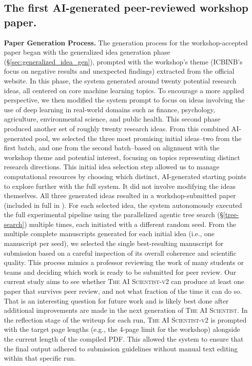 \documentclass[11pt, a4paper]{include/gdm_format}
\newcommand{\ouralgo}{\textsc{The AI Scientist-v2}\xspace}
\begin{document}
\subsection{The first AI-generated peer-reviewed workshop paper.}
\label{sec:first_workshop_paper}
\textbf{Paper Generation Process.}
The generation process for the workshop-accepted paper began with the generalized idea generation phase (\S\ref{sec:generalized_idea_gen}), prompted with the workshop's theme (ICBINB's focus on negative results and unexpected findings) extracted from the official website.
In this phase, the system generated around twenty potential research ideas, all centered on core machine learning topics.
To encourage a more applied perspective, we then modified the system prompt to focus on ideas involving the use of deep learning in real-world domains such as finance, psychology, agriculture, environmental science, and public health. This second phase produced another set of roughly twenty research ideas.
From this combined AI-generated pool, we selected the three most promising initial ideas--two from the first batch, and one from the second batch--based on alignment with the workshop theme and potential interest, focusing on topics representing distinct research directions.
This initial idea selection step allowed us to manage computational resources by choosing which distinct, AI-generated starting points to explore further with the full system.
It did not involve modifying the ideas themselves.
All three generated ideas resulted in a workshop-submitted paper (included in full in ).
For each selected idea, the system autonomously executed the full experimental pipeline using the parallelized agentic tree search (\S\ref{tree-search}) multiple times, each initiated with a different random seed. From the multiple complete manuscripts generated for each initial idea (i.e., one manuscript per seed), we selected the single best-resulting manuscript for submission based on a careful inspection of its overall coherence and scientific quality.
This process mimics a professor reviewing the work of many students or teams and deciding which work is ready to be submitted for peer review. Our current study aims to see whether \ouralgo can produce at least one paper that survives peer review, and not what fraction of the time it can do so. That is an interesting question for future work and is likely best done after additional improvements are made in the next generation of \textsc{The AI Scientist}.
In the reflection stage of the writeup for each run, \ouralgo is prompted with the target page lengths (e.g., the 4-page limit for the workshop) alongside the current length of the compiled PDF.
This allowed the system to ensure that the final output adhered to submission guidelines without manual text editing within that specific run.
\end{document}
